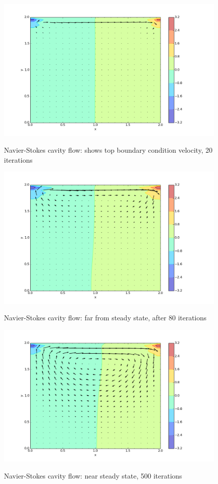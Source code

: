 \documentclass[11pt]{article}
\begin{document}
{	\begin{figure}[H]
	\centering
	\caption{Navier-Stokes cavity flow: shows top boundary condition velocity, 20 iterations}
	\includegraphics[scale=0.57]{cavity_0ish.png}
	\label{fig:cavity_0ish}
	\end{figure}

	\begin{figure}[H]
	\centering
	\caption{Navier-Stokes cavity flow: far from steady state, after 80 iterations}
	\includegraphics[scale=0.57]{cavity_med.png}
	\label{fig:cavity_med}
	\end{figure}

	\begin{figure}[H]
	\centering
	\caption{Navier-Stokes cavity flow: near steady state, 500 iterations}
	\includegraphics[scale=0.57]{cavity_final0.png}
	\label{fig:cavity_final0}
	\end{figure}

}
\end{document}
